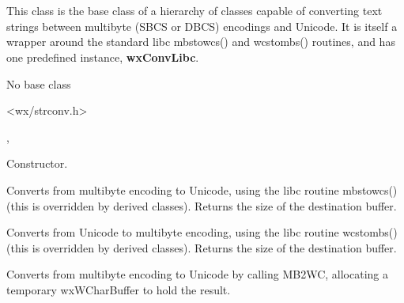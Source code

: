 %
%


\section{}\label{wxmbconv}

This class is the base class of a hierarchy of classes capable of converting
text strings between multibyte (SBCS or DBCS) encodings and Unicode. It is itself
a wrapper around the standard libc mbstowcs() and wcstombs() routines, and has
one predefined instance, {\bf wxConvLibc}.


No base class


<wx/strconv.h>


, 



\label{wxmbconvwxmbconv}


Constructor.

\label{wxmbconvmb2wc}


Converts from multibyte encoding to Unicode, using the libc routine mbstowcs()
(this is overridden by derived classes). Returns the size of the destination buffer.

\label{wxmbconvwc2mb}


Converts from Unicode to multibyte encoding, using the libc routine wcstombs()
(this is overridden by derived classes). Returns the size of the destination buffer.

\label{wxmbconvcmb2wc}


Converts from multibyte encoding to Unicode by calling MB2WC,
allocating a temporary wxWCharBuffer to hold the result.

